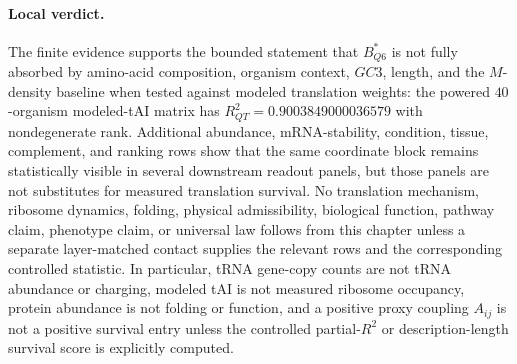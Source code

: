 \paragraph{Local verdict.}
The finite evidence supports the bounded statement that $B^{*}_{Q6}$ is not fully absorbed by amino-acid composition, organism context, $GC3$, length, and the $M$-density baseline when tested against modeled translation weights: the powered $40$-organism modeled-tAI matrix has $R^2_{QT}=0.9003849000036579$ with nondegenerate rank. Additional abundance, mRNA-stability, condition, tissue, complement, and ranking rows show that the same coordinate block remains statistically visible in several downstream readout panels, but those panels are not substitutes for measured translation survival. No translation mechanism, ribosome dynamics, folding, physical admissibility, biological function, pathway claim, phenotype claim, or universal law follows from this chapter unless a separate layer-matched contact supplies the relevant rows and the corresponding controlled statistic. In particular, tRNA gene-copy counts are not tRNA abundance or charging, modeled tAI is not measured ribosome occupancy, protein abundance is not folding or function, and a positive proxy coupling $A_{ij}$ is not a positive survival entry unless the controlled partial-$R^2$ or description-length survival score is explicitly computed.

